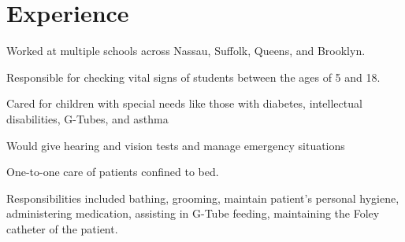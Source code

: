 \documentclass[]{deedy-resume-openfont}
\begin{document}
\begin{minipage}[t]{0.66\textwidth} 


\section{Experience}

\vspace{\topsep} %
\begin{tightemize}

\item Worked at multiple schools across Nassau, Suffolk, Queens, and Brooklyn.

\item Responsible for checking vital signs of students between the ages of 5 and 18.

\item Cared for children with special needs like those with diabetes, intellectual disabilities, G-Tubes, and asthma

\item Would give hearing and vision tests and manage emergency situations

\end{tightemize}
\sectionsep

\begin{tightemize}

\item One-to-one care of patients confined to bed. 

\item Responsibilities included bathing, grooming, maintain patient’s personal hygiene, administering medication, assisting in G-Tube feeding, maintaining the Foley catheter of the patient.

\end{tightemize}
\sectionsep


\begin{tightemize}


\end{tightemize}
\end{minipage}
\end{document}
